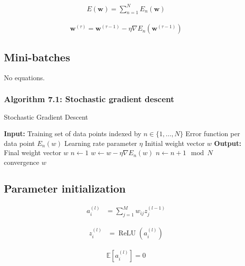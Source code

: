 \documentclass{article}
\begin{document}
\begin{align*}
E(\mathbf{w})=\sum_{n=1}^{N} E_{n}(\mathbf{w})
\tag{7.17}
\end{align*}

\begin{align*}
\mathbf{w}^{(\tau)}=\mathbf{w}^{(\tau-1)}-\eta \nabla E_{n}\left(\mathbf{w}^{(\tau-1)}\right)
\tag{7.18}
\end{align*}

\subsection{Mini-batches}

No equations.

\subsubsection{Algorithm 7.1: Stochastic gradient descent}

\begin{algorithm}
\caption{Stochastic Gradient Descent}
\begin{algorithmic}[1]
\STATE \textbf{Input:} Training set of data points indexed by $n \in \{1, \ldots, N\}$
\STATE \quad Error function per data point $E_n(w)$
\STATE \quad Learning rate parameter $\eta$
\STATE \quad Initial weight vector $w$
\STATE \textbf{Output:} Final weight vector $w$
\STATE $n \gets 1$
\REPEAT
    \STATE $w \gets w - \eta \nabla E_n(w)$ 
    \STATE $n \gets n + 1 \mod N$ 
\UNTIL convergence
\RETURN $w$
\end{algorithmic}
\end{algorithm}

\subsection{Parameter initialization}

\begin{align*}
a_{i}^{(l)} & =\sum_{j=1}^{M} w_{i j} z_{j}^{(l-1)}  
\tag{7.19}
\end{align*}

\begin{align*}
z_{i}^{(l)} & =\operatorname{ReLU}\left(a_{i}^{(l)}\right)
\tag{7.20}
\end{align*}

\begin{align*}
\mathbb{E}\left[ a_{i}^{(l)}\right] =0  
\tag{7.21}
\end{align*}
\end{document}
